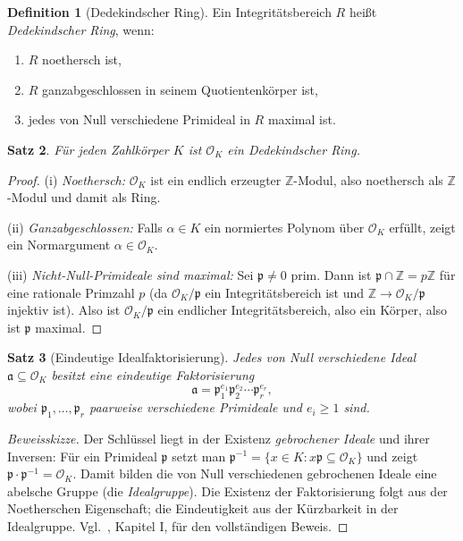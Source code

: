 \documentclass[12pt,a4paper]{amsart}
\newtheorem{theorem}{Satz}[section]
\theoremstyle{definition}
\newtheorem{definition}[theorem]{Definition}
\newcommand{\Z}{\mathbb{Z}}
\newcommand{\OK}{\mathcal{O}_K}
\newcommand{\p}{\mathfrak{p}}
\newcommand{\aaa}{\mathfrak{a}}
\begin{document}
\begin{definition}[Dedekindscher Ring]
\label{def:dedekind}
Ein Integritätsbereich $R$ heißt \emph{Dedekindscher Ring}, wenn:
\begin{enumerate}[label=(\roman*)]
  \item $R$ noethersch ist,
  \item $R$ ganzabgeschlossen in seinem Quotientenkörper ist,
  \item jedes von Null verschiedene Primideal in $R$ maximal ist.
\end{enumerate}
\end{definition}

\begin{theorem}
\label{thm:OK_dedekind}
Für jeden Zahlkörper $K$ ist $\OK$ ein Dedekindscher Ring.
\end{theorem}

\begin{proof}
(i) \emph{Noethersch:} $\OK$ ist ein endlich erzeugter $\Z$-Modul,
also noethersch als $\Z$-Modul und damit als Ring.

(ii) \emph{Ganzabgeschlossen:} Falls $\alpha \in K$ ein normiertes Polynom
über $\OK$ erfüllt, zeigt ein Normargument $\alpha \in \OK$.

(iii) \emph{Nicht-Null-Primideale sind maximal:} Sei $\p \ne 0$ prim.
Dann ist $\p \cap \Z = p\Z$ für eine rationale Primzahl $p$ (da $\OK/\p$
ein Integritätsbereich ist und $\Z \to \OK/\p$ injektiv ist).
Also ist $\OK/\p$ ein endlicher Integritätsbereich, also ein Körper,
also ist $\p$ maximal.
\end{proof}

\begin{theorem}[Eindeutige Idealfaktorisierung]
\label{thm:ufid}
Jedes von Null verschiedene Ideal $\aaa \subseteq \OK$ besitzt eine
eindeutige Faktorisierung
\[
  \aaa = \p_1^{e_1} \p_2^{e_2} \cdots \p_r^{e_r},
\]
wobei $\p_1, \ldots, \p_r$ paarweise verschiedene Primideale und $e_i \ge 1$ sind.
\end{theorem}

\begin{proof}[Beweisskizze]
Der Schlüssel liegt in der Existenz \emph{gebrochener Ideale} und ihrer
Inversen: Für ein Primideal $\p$ setzt man
$\p^{-1} = \{x \in K : x\p \subseteq \OK\}$ und zeigt $\p \cdot \p^{-1} = \OK$.
Damit bilden die von Null verschiedenen gebrochenen Ideale eine abelsche
Gruppe (die \emph{Idealgruppe}).  Die Existenz der Faktorisierung folgt
aus der Noetherschen Eigenschaft; die Eindeutigkeit aus der Kürzbarkeit
in der Idealgruppe.  Vgl.\ \cite{Neukirch1992}, Kapitel I, für den
vollständigen Beweis.
\end{proof}
\end{document}
